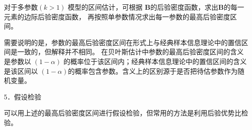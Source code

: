 		   对于多参数$ (k > 1)  $ 模型的区间估计，可根据 $ \boldsymbol{B} $的后验密度函数，求出$ \boldsymbol{B} $的每一元素的边际后验密度函数，
		   再按照单参数情况求出每一参数的最高后验密度区间。
		   
		   需要说明的是，参数的最高后验密度区间在形式上与经典样本信息理论中的置信区间是一致的，但解释并不相同。
		   在贝叶斯估计中参数的最高后验密度区间的含义是参数以 $ ( 1-\alpha) $ 的概率位于该区间内；经典样本信息理论中的置信区间的含义是该区间以
		   $ ( 1-\alpha) $的概率包含参数。含义上的区别源于是否把待估参数作为随机变量。
		   
		   5．假设检验
		   
		   可以用上述的最高后验密度区间进行假设检验，但常用的方法是利用后验优势比检验。
		   
		   